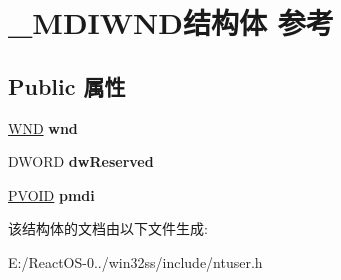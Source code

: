 \hypertarget{struct___m_d_i_w_n_d}{}\section{\+\_\+\+M\+D\+I\+W\+N\+D结构体 参考}
\label{struct___m_d_i_w_n_d}
\subsection*{Public 属性}
\begin{DoxyCompactItemize}
\item 
\mbox{\label{struct___m_d_i_w_n_d_a3de9ad4850a7a91c95227998559c56b7}} 
\hyperlink{struct___w_n_d}{W\+ND} {\bfseries wnd}
\item 
\mbox{\label{struct___m_d_i_w_n_d_a28d9ac52e5618dd9ab1f36c1c5294ac8}} 
D\+W\+O\+RD {\bfseries dw\+Reserved}
\item 
\mbox{\label{struct___m_d_i_w_n_d_a8753ba91950099197dc00398f3812718}} 
\hyperlink{interfacevoid}{P\+V\+O\+ID} {\bfseries pmdi}
\end{DoxyCompactItemize}


该结构体的文档由以下文件生成\+:\begin{DoxyCompactItemize}
\item 
E\+:/\+React\+O\+S-\/0../win32ss/include/ntuser.\+h\end{DoxyCompactItemize}
